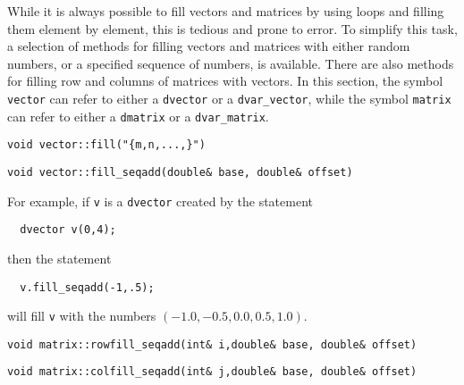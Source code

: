 While it is always possible to fill vectors and matrices by
using loops and filling them element by element, this is tedious
and prone to error. To simplify this task, a selection 
of methods for filling vectors and
matrices with either random numbers, or a specified sequence of numbers, is available.
There are also methods for filling row and columns of matrices with
vectors. In this section, the symbol \texttt{vector} can refer to either
a \texttt{dvector} or a \texttt{dvar\_vector},
while the symbol \texttt{matrix} can refer to either
a \texttt{dmatrix} or a \texttt{dvar\_matrix}.

\begin{lstlisting}
void vector::fill("{m,n,...,}")
\end{lstlisting}

  
\begin{lstlisting}
void vector::fill_seqadd(double& base, double& offset)
\end{lstlisting}

For example, if \texttt{v} is a \texttt{dvector} created by the statement
\begin{lstlisting}
  dvector v(0,4);
\end{lstlisting}
then the statement
\begin{lstlisting}
  v.fill_seqadd(-1,.5);
\end{lstlisting}
will fill \texttt{v} with the numbers $(-1.0,-0.5,0.0,0.5,1.0)$.

  
\begin{lstlisting}
void matrix::rowfill_seqadd(int& i,double& base, double& offset)
\end{lstlisting}

  
\begin{lstlisting}
void matrix::colfill_seqadd(int& j,double& base, double& offset)
\end{lstlisting}

